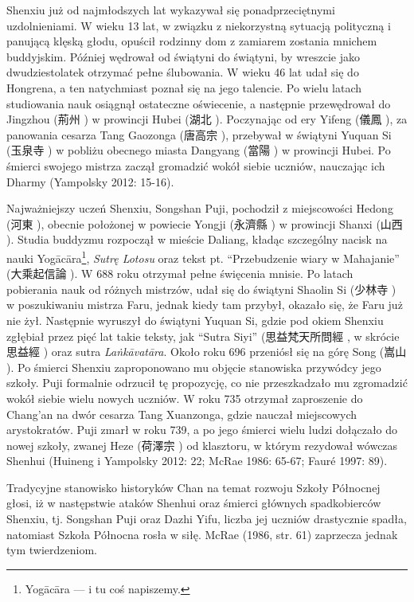 Shenxiu już od najmłodszych lat wykazywał się ponadprzeciętnymi uzdolnieniami.
W wieku 13 lat, w związku z niekorzystną sytuacją polityczną i panującą klęską głodu, opuścił rodzinny dom z zamiarem zostania mnichem buddyjskim.
Później wędrował od świątyni do świątyni, by wreszcie jako dwudziestolatek otrzymać pełne ślubowania.
W wieku 46 lat udał się do Hongrena, a ten natychmiast poznał się na jego talencie.
Po wielu latach studiowania nauk osiągnął ostateczne oświecenie, a następnie przewędrował do Jingzhou (荊州 ) w prowincji Hubei (湖北 ).
Poczynając od ery Yifeng (儀鳳 ), za panowania cesarza Tang Gaozonga (唐高宗 ), przebywał w świątyni Yuquan Si (玉泉寺 ) w pobliżu obecnego miasta Dangyang (當陽 ) w prowincji Hubei.
Po śmierci swojego mistrza zaczął gromadzić wokół siebie uczniów, nauczając ich Dharmy
(Yampolsky 2012: 15-16).

Najważniejszy uczeń Shenxiu, Songshan Puji, pochodził z miejscowości Hedong (河東 ), obecnie położonej w powiecie Yongji (永濟縣 ) w prowincji Shanxi (山西 ).
Studia buddyzmu rozpoczął w mieście Daliang, kładąc szczególny nacisk na nauki Yogācāra\footnote{Yogācāra --- i tu coś napiszemy.}, \textit{Sutrę Lotosu} oraz tekst pt. ``Przebudzenie wiary w Mahajanie'' (大乘起信論 ).
W 688 roku otrzymał pełne święcenia mnisie.
Po latach pobierania nauk od różnych mistrzów, udał się do świątyni Shaolin Si (少林寺 ) w poszukiwaniu mistrza Faru, jednak kiedy tam przybył, okazało się, że Faru już nie żył.
Następnie wyruszył do świątyni Yuquan Si, gdzie pod okiem Shenxiu zgłębiał przez pięć lat takie teksty, jak ``Sutra Siyi'' (思益梵天所問經 , w skrócie 思益經 ) oraz sutra \textit{La\.nkā\-vatāra}.
Około roku 696 przeniósł się na górę Song (嵩山 ).
Po śmierci Shenxiu zaproponowano mu objęcie stanowiska przywódcy jego szkoły.
Puji formalnie odrzucił tę propozycję, co nie przeszkadzało mu zgromadzić wokół siebie wielu nowych uczniów.
W roku 735 otrzymał zaproszenie do Chang'an na dwór cesarza Tang Xuanzonga, gdzie nauczał miejscowych arystokratów.
Puji zmarł w roku 739, a po jego śmierci wielu ludzi dołączało do nowej szkoły, zwanej Heze (荷澤宗 ) od klasztoru, w którym rezydował wówczas Shenhui %
(Huineng i Yampolsky 2012: 22; McRae 1986: 65-67; Fauré 1997: 89).

Tradycyjne stanowisko historyków Chan na temat rozwoju Szkoły Północnej głosi, iż w następstwie ataków Shenhui oraz śmierci głównych spadkobierców Shenxiu, tj. Songshan Puji oraz Dazhi Yifu, liczba jej uczniów drastycznie spadła, natomiast Szkoła Północna rosła w siłę.
McRae (1986, str. 61) zaprzecza jednak tym twierdzeniom.

